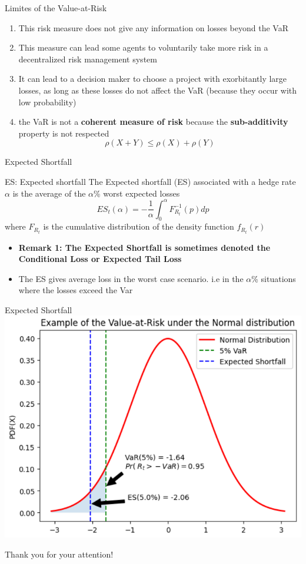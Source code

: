 \documentclass{beamer}
\newcommand{\imfbold}[1]{\textbf{\textcolor{imfblue}{#1}}}
\begin{document}
\begin{frame}{Limites of the Value-at-Risk}
   \begin{enumerate}
       \item This risk measure does not give any information on losses beyond the VaR
       \item  This measure can lead some agents to voluntarily take more risk in a decentralized risk management system
       \item It can lead to a decision maker to choose a project with exorbitantly  large losses, as long as these losses do not affect the VaR (because they occur with low probability)
       \item the VaR is not a \imfbold{coherent measure of risk} because the \imfbold{sub-additivity} property is not respected
       $$\rho(X+Y) \leq \rho(X) + \rho(Y)$$
   \end{enumerate} 
\end{frame}
\begin{frame}{Expected Shortfall}
    \begin{block}{ES: Expected shortfall}
        The Expected shortfall (ES) associated with a hedge rate $\alpha$ is the average of the $\alpha$\% worst expected losses 
        $$ES_t(\alpha) = -\frac{1}{\alpha} \int_0^{\alpha}{F_{R_t}^{-1}(p)dp} $$
        where $F_{R_t}$ is the cumulative distribution of the density function $f_{R_t}(r)$
    \end{block}
    \begin{itemize}
        \item \textbf{Remark 1: The Expected Shortfall is sometimes denoted the \imfbold{Conditional Loss} or \imfbold{Expected Tail Loss}}
        \item The ES gives average loss in the worst case scenario. i.e in the $\alpha$\% situations where the losses exceed the Var
    \end{itemize}
\end{frame}

\begin{frame}{Expected Shortfall}
   \centering
   \includegraphics[width=.9\textwidth]{static/course_3_img/ES_normal.PNG}
\end{frame}
\begin{frame}
    \centering
    \Huge Thank you for your attention!
\end{frame}
\end{document}
